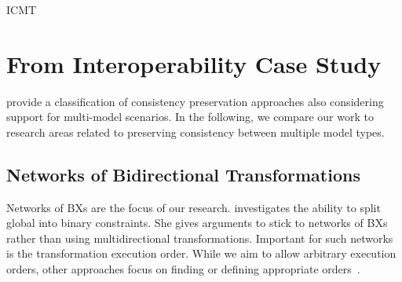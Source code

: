 \begin{copiedFrom}{ICMT}

\section{From Interoperability Case Study}

\textcite{macedo2017a} provide a classification of consistency preservation approaches also considering support for multi-model scenarios. %
In the following, we compare our work to research areas related to preserving consistency between multiple model types.

\subsection*{Networks of Bidirectional Transformations} 
Networks of \acp{BX} are the focus of our research.
\textcite{stevens2017a} investigates the ability to split global into binary constraints.
She gives arguments to stick to networks of \acp{BX} rather than using multidirectional transformations. %
Important for such networks is the transformation execution order. 
While we aim to allow arbitrary execution orders, other approaches focus on finding or defining appropriate orders~\cite{stevens2018megamodels}.



\end{copiedFrom}
